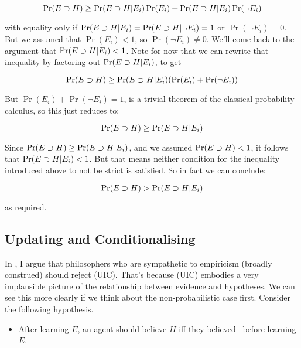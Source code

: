 \begin{equation}
\Pr(E \supset H) \geq \Pr(E \supset H | E_i)\Pr(E_i) + \Pr(E \supset H | E_i)\Pr(\neg E_i)
\end{equation} 

\noindent with equality only if  $\Pr(E \supset H | E_i) =  \Pr(E \supset H | \neg E_i) = 1$ or $\Pr(\neg E_i) = 0$. But we assumed that $\Pr(E_i) < 1$, so $\Pr(\neg E_i) \neq 0$. We'll come back to the argument that $\Pr(E \supset H | E_i) < 1$. Note for now that we can rewrite that inequality by factoring out $\Pr(E \supset H | E_i)$, to get

\begin{equation}
\Pr(E \supset H) \geq \Pr(E \supset H | E_i)(\Pr(E_i) + \Pr(\neg E_i))
\end{equation} 

\noindent But $\Pr(E_i) + \Pr(\neg E_i) = 1$, is a trivial theorem of the classical probability calculus, so this just reduces to:

\begin{equation}
\Pr(E \supset H) \geq \Pr(E \supset H | E_i)
\end{equation} 

\noindent Since $\Pr(E \supset H) \geq \Pr(E \supset H | E_i)$, and we assumed $\Pr(E \supset H) < 1$, it follows that $\Pr(E \supset H | E_i) < 1$. But that means neither condition for the inequality introduced above to not be strict is satisfied. So in fact we can conclude:

\begin{equation}
\Pr(E \supset H) > \Pr(E \supset H | E_i)
\end{equation} 

\noindent as required.

\subsection{Updating and Conditionalising}

In \citet{Weatherson2007}, I argue that philosophers who are sympathetic to empiricism (broad\-ly con\-stru\-ed) should reject (UIC). That's because (UIC) embodies a very implausible picture of the relationship between evidence and hypotheses. We can see this more clearly if we think about the non-probabilistic case first. Consider the following hypothesis.

\begin{itemize}
\item After learning $E$, an agent should believe $H$ iff they believed \ECH\ before learning $E$.
\end{itemize}

